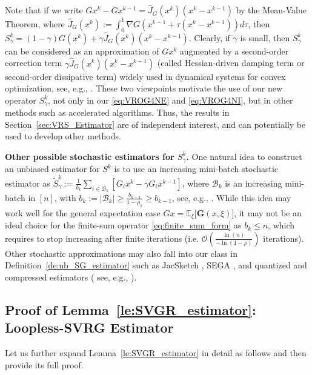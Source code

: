 \documentclass{article}
\newcommand{\Expsk}[2]{\mathbb{E}_{#1}\big[#2\big]}
\newcommand{\Bc}{\mathcal{B}}
\newcommand{\BigO}[1]{\mathcal{O}\left(#1\right)}
\newcommand{\beforesubsec}{\vspace{-1.5ex}}
\newcommand{\aftersubsec}{\vspace{-1.5ex}}
\theoremstyle{plain}
\theoremstyle{definition}
\theoremstyle{remark}
\begin{document}
Note that if we write $Gx^k - Gx^{k-1} =  \hat{J}_G(x^k)(x^k - x^{k-1})$ by the Mean-Value Theorem, where $\hat{J}_G(x^k) := \int_0^1\nabla{G}(x^{k-1} + \tau(x^k - x^{k-1}))d\tau$, then $S^k_{\gamma} = (1-\gamma)G(x^k) + \gamma \hat{J}_G(x^k)(x^k - x^{k-1})$.
Clearly, if $\gamma$ is small, then $S_{\gamma}^k$ can be considered as an approximation of $Gx^k$ augmented by a second-order correction term $\gamma\hat{J}_G(x^k)(x^k - x^{k-1})$ (called Hessian-driven damping term or second-order dissipative term) widely used in dynamical systems for convex optimization, see, e.g., \citep{adly2021first,attouch2020convergence}.
These two viewpoints motivate the use of our new operator $S^k_{\gamma}$, not only in our \eqref{eq:VROG4NE} and \eqref{eq:VROG4NI}, but in other methods such as accelerated algorithms.
Thus, the results in Section~\ref{sec:VRS_Estimator} are of independent interest, and can potentially be used to develop other methods. 

\textbf{Other possible stochastic estimators for $S^k_{\gamma}$.}
One natural idea to construct an unbiased estimator for $S^k$ is to use an increasing mini-batch stochastic estimator as $\widetilde{S}_{\gamma}^k := \frac{1}{b_k}\sum_{i\in\Bc_k}[ G_ix^k - \gamma G_ix^{k-1}]$, where $\Bc_k$ is an increasing mini-batch in $[n]$, with $b_k := \vert \Bc_k\vert \geq \frac{b_{k-1}}{1-\rho_k} \geq b_{k-1}$, see, e.g., \citep{iusem2017extragradient}.
While this idea may work well for the general expectation case $Gx = \Expsk{\xi}{\mathbf{G}(x, \xi)}$, it may not be an ideal choice for the finite-sum operator \eqref{eq:finite_sum_form} as $b_k \leq n$, which requires to stop increasing after finite iterations (i.e. $\BigO{\frac{\ln(n)}{-\ln(1-\rho)}}$ iterations).
Other stochastic approximations may also fall into our class in Definition~\ref{de:ub_SG_estimator} such as JacSketch \citep{gower2021stochastic}, SEGA \citep{hanzely2018sega}, and quantized and compressed estimators ( see, e.g., \citep{horvath2023stochastic}).

\beforesubsec
\subsection{Proof of Lemma~\ref{le:SVGR_estimator}: Loopless-SVRG Estimator}\label{subsec:le:SVGR_estimator}
\aftersubsec
Let us further expand Lemma~\ref{le:SVGR_estimator} in detail as follows and then provide its full proof.
\end{document}
